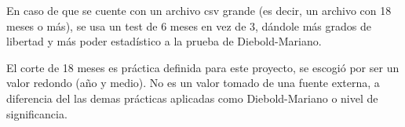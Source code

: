 En caso de que se cuente con un archivo csv grande (es decir, un archivo con 18 meses o más), se usa un test de 6 meses en vez de 3, dándole más grados de libertad y más poder estadístico a la prueba de Diebold-Mariano. 

El corte de 18 meses es práctica definida para este proyecto, se escogió por ser un valor redondo (año y medio). No es un valor tomado de una fuente externa, a diferencia del las demas prácticas aplicadas como Diebold-Mariano o nivel de significancia.